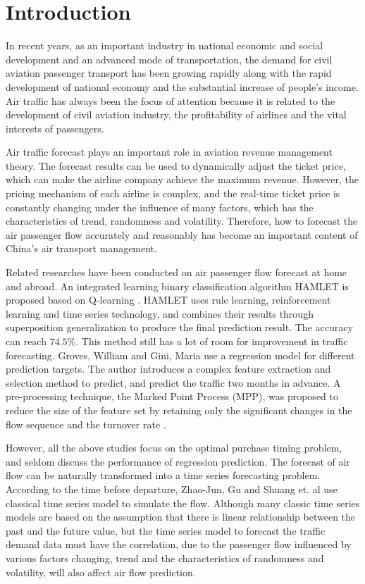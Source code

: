 \documentclass[journal,article,submit,moreauthors,pdftex]{Definitions/mdpi}
\begin{document}
\section{Introduction}
In recent years, as an important industry in national economic and social development and an advanced mode of transportation, the demand for civil aviation passenger transport has been growing rapidly along with the rapid development of national economy and the substantial increase of people's income. Air traffic has always been the focus of attention because it is related to the development of civil aviation industry, the profitability of airlines and the vital interests of passengers\cite{1}.
\par Air traffic forecast plays an important role in aviation revenue management theory. The forecast results can be used to dynamically adjust the ticket price, which can make the airline company achieve the maximum revenue. However, the pricing mechanism of each airline is complex, and the real-time ticket price is constantly changing under the influence of many factors, which has the characteristics of trend, randomness and volatility. Therefore, how to forecast the air passenger flow accurately and reasonably has become an important content of China's air transport management.
\par Related researches have been conducted on air passenger flow forecast at home and abroad.  An integrated learning binary classification algorithm HAMLET is proposed based on Q-learning \cite{2}. HAMLET uses rule learning, reinforcement learning and time series technology, and combines their results through superposition generalization to produce the final prediction result. The accuracy can reach $74.5\%$. This method still has a lot of room for improvement in traffic forecasting. Groves, William and Gini, Maria \cite{3} use a regression model for different prediction targets. The author introduces a complex feature extraction and selection method to predict, and predict the traffic two months in advance. A pre-processing technique, the Marked Point Process (MPP), was proposed to reduce the size of the feature set by retaining only the significant changes in the flow sequence and the turnover rate \cite{4}.
\par  However, all the above studies focus on the optimal purchase timing problem, and seldom discuss the performance of regression prediction. The forecast of air flow can be naturally transformed into a time series forecasting problem. According to the time before departure, Zhao-Jun, Gu and Shuang et. al \cite{5} use classical time series model to simulate the flow. Although many classic time series models are based on the assumption that there is linear relationship between the past and the future value, but the time series model to forecast the traffic demand data must have the correlation, due to the passenger flow influenced by various factors changing, trend and the characteristics of randomness and volatility, will also affect air flow prediction.
\end{document}

